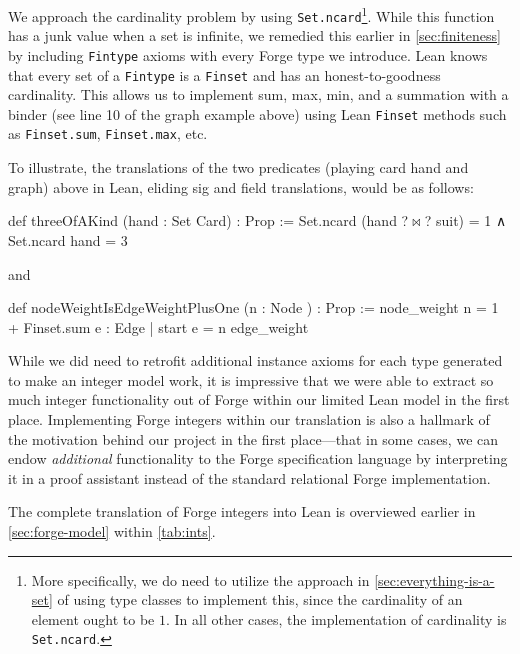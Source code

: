 We approach the cardinality problem by using \texttt{Set.ncard}\footnote{More specifically, we do need to utilize the approach in \cref{sec:everything-is-a-set} of using type classes to implement this, since the cardinality of an element ought to be $1$. In all other cases, the implementation of cardinality is \texttt{Set.ncard}.}. While this function has a junk value when a set is infinite, we remedied this earlier in \cref{sec:finiteness} by including \texttt{Fintype} axioms with every Forge type we introduce. Lean knows that every set of a \texttt{Fintype} is a \texttt{Finset} and has an honest-to-goodness cardinality. This allows us to implement sum, max, min, and a summation with a binder (see line 10 of the graph example above) using Lean \texttt{Finset} methods such as \texttt{Finset.sum}, \texttt{Finset.max}, etc. 

To illustrate, the translations of the two predicates (playing card hand and graph) above in Lean, eliding sig and field translations, would be as follows:
\begin{lean*}
def threeOfAKind (hand : Set Card) : Prop :=
  Set.ncard (hand ?$\bowtie$? suit) = 1 ∧ Set.ncard hand = 3
\end{lean*}
and 

\begin{lean*}
def nodeWeightIsEdgeWeightPlusOne (n : Node ) : Prop :=
  node_weight n = 1 + Finset.sum { e : Edge | start e = n } edge_weight
\end{lean*}

While we did need to retrofit additional instance axioms for each type generated to make an integer model work, it is impressive that we were able to extract so much integer functionality out of Forge within our limited Lean model in the first place. Implementing Forge integers within our translation is also a hallmark of the motivation behind our project in the first place---that in some cases, we can endow \emph{additional} functionality to the Forge specification language by interpreting it in a proof assistant instead of the standard relational Forge implementation. 

The complete translation of Forge integers into Lean is overviewed earlier in \cref{sec:forge-model} within \cref{tab:ints}. 